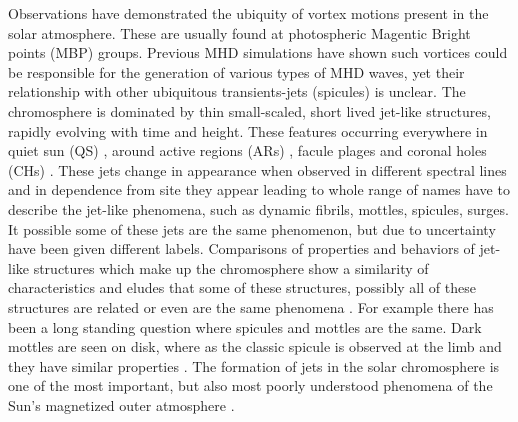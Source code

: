 \documentclass[12pt]{ociamthesis}
\begin{document}
Observations have demonstrated the ubiquity of vortex motions present in the solar atmosphere. These are usually found at photospheric Magentic Bright points (MBP) groups. Previous MHD simulations have shown such vortices could be responsible for the generation of various types of MHD waves, yet their relationship with other ubiquitous transients-jets (spicules) is unclear.
The chromosphere is dominated by thin small-scaled, short lived  jet-like structures, rapidly evolving with time and height. These features occurring everywhere in quiet sun (QS) \citep{Pontieu2007astroph2081D,Rouppe2007ApJ660L169R,Pereira2012,Pereira2014ApJ}, around active regions (ARs) \citep{Pontieu2007astroph2081D,Pereira2012,Rouppe2013ApJ77656R,Gafeira2017ApJS2296G}, facule plages and coronal holes (CHs) \citep{Yamauchi2005ApJ629572Y,Moreno2008ApJ673L211M,Pereira2012,Young2015ApJ801124Y}. These jets change in appearance when observed in different spectral lines and in dependence from site they appear leading to whole range of names have to describe the jet-like phenomena, such as dynamic fibrils, mottles, spicules, surges. It possible some of these jets are the same phenomenon, but due to uncertainty have been given different labels. Comparisons of properties and behaviors of jet-like structures which make up the chromosphere show a similarity of characteristics and eludes that some of these structures, possibly all of these structures are related or even are the same phenomena \cite{Porfir2016A}. For example there has been a long standing question where spicules and mottles are the same. Dark mottles are seen on disk, where as the classic spicule is observed at the limb and they have similar properties \cite{Pontieu2007ASPC}. The formation of jets in the solar chromosphere is one of the most important, but also most poorly understood phenomena of the Sun's magnetized outer atmosphere \citep{Hansteen2006ApJ}. 
\end{document}
